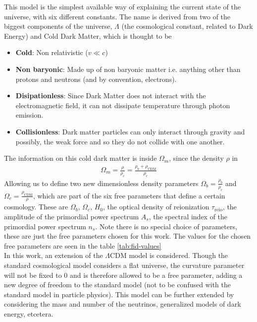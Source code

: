 This model is the simplest available way of explaining the current state of the universe, with six different constants. The name is derived from two of the biggest components of the universe, $\Lambda$ (the cosmological constant, related to Dark Energy) and Cold Dark Matter, which is thought to be
\begin{itemize}
	\item \textbf{Cold}: Non relativistic ($v \ll c$)
	\item \textbf{Non baryonic}: Made up of non baryonic matter i.e. anything other than protons and neutrons (and by convention, electrons).
	\item \textbf{Disipationless}: Since Dark Matter does not interact with the electromagnetic field, it can not dissipate temperature through photon emission.
	\item \textbf{Collisionless}: Dark matter particles can only interact through gravity and possibly, the weak force and so they do not collide with one another.
\end{itemize}
The information on this cold dark matter is inside $\Omega_m$, since the density $\rho$ in
\begin{align}
	\Omega_m = \frac{\rho}{\rho_c} = \frac{\rho_b + \rho_{\text{CDM}}}{\rho_c}
\end{align}
Allowing us to define two new dimensionless density parameters $\Omega_b = \frac{\rho_b}{\rho_c}$ and $\Omega_c =  \frac{\rho_\text{CDM}}{\rho}$, which are part of the six free parameters that define a certain cosmology. These are $\Omega_b$, $\Omega_c$, $H_0$, the optical density of reionization $\tau_{\text{reio}}$, the amplitude of the primordial power spectrum $A_s$, the spectral index of the primordial power spectrum $n_s$. Note there is no special choice of parameters, these are just the free parameters chosen for this work. The values for the chosen free parameters are seen in the table \ref{tab:fid-values}\\

In this work, an extension of the $\Lambda$CDM model is considered. Though the standard cosmological model considers a flat universe, the curvature parameter will not be fixed to $0$ and is therefore allowed to be a free parameter, adding a new degree of freedom to the standard model (not to be confused with the standard model in particle physics). This model can be further extended by considering the mass and number of the neutrinos, generalized models of dark energy, etcetera.

